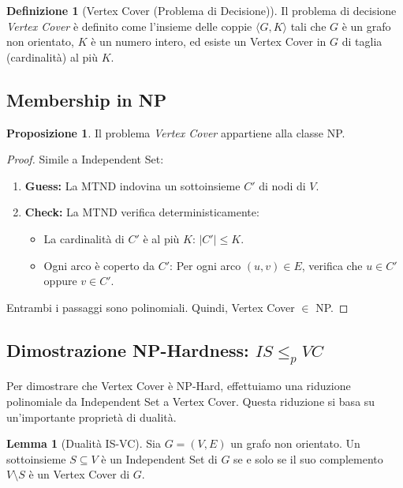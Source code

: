 \documentclass[a4paper]{article}
\theoremstyle{definition} %
\newtheorem{definition}{Definizione}[section]
\newtheorem{lemma}{Lemma}[section]
\newtheorem{proposition}{Proposizione}[section]
\theoremstyle{definition} %
\begin{document}
\begin{definition}[Vertex Cover (Problema di Decisione)]
Il problema di decisione \emph{Vertex Cover} è definito come l'insieme delle coppie $\langle G, K \rangle$ tali che $G$ è un grafo non orientato, $K$ è un numero intero, ed esiste un Vertex Cover in $G$ di taglia (cardinalità) al più $K$.
\end{definition}

\subsection{Membership in NP}

\begin{proposition}
Il problema \emph{Vertex Cover} appartiene alla classe NP.
\end{proposition}

\begin{proof}
Simile a Independent Set:
\begin{enumerate}
    \item \textbf{Guess:} La MTND indovina un sottoinsieme $C'$ di nodi di $V$.
    \item \textbf{Check:} La MTND verifica deterministicamente:
    \begin{itemize}
        \item La cardinalità di $C'$ è al più $K$: $|C'| \le K$.
        \item Ogni arco è coperto da $C'$: Per ogni arco $(u, v) \in E$, verifica che $u \in C'$ oppure $v \in C'$.
    \end{itemize}
\end{enumerate}
Entrambi i passaggi sono polinomiali. Quindi, Vertex Cover $\in$ NP.
\end{proof}

\subsection{Dimostrazione NP-Hardness: $IS \le_p VC$}

Per dimostrare che Vertex Cover è NP-Hard, effettuiamo una riduzione polinomiale da Independent Set a Vertex Cover. Questa riduzione si basa su un'importante proprietà di dualità.

\begin{lemma}[Dualità IS-VC]
Sia $G=(V, E)$ un grafo non orientato. Un sottoinsieme $S \subseteq V$ è un Independent Set di $G$ se e solo se il suo complemento $V \setminus S$ è un Vertex Cover di $G$.
\end{lemma}
\end{document}
